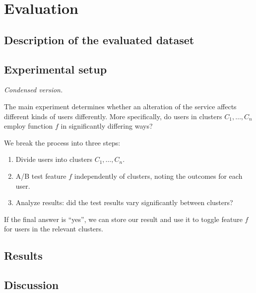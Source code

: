 \chapter{Evaluation}

\label{Chapter4}


\section{Description of the evaluated dataset} %
\label{sec:description_of_the_evaluated_dataset}




\section{Experimental setup} %
\label{sec:experimental_setup}

\emph{Condensed version.}

The main experiment determines whether an alteration of the service affects different kinds of users differently.
More specifically, do users in clusters $C_1, \ldots, C_n$ employ function $f$ in significantly differing ways?

We break the process into three steps:

\begin{enumerate}
  \item Divide users into clusters $C_1, \ldots, C_n$.
  \item A/B test feature $f$ independently of clusters, noting the outcomes for each user.
  \item Analyze results: did the test results vary significantly between clusters?
\end{enumerate}

If the final answer is ``yes'', we can store our result and use it to toggle feature $f$ for users in the relevant clusters.


\section{Results} %
\label{sec:results}


\section{Discussion} %
\label{sec:discussion}

